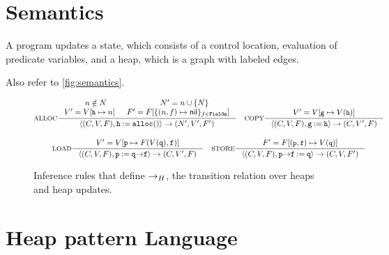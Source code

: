 \section{Semantics}
\label{sec:semantics}
%
A \lang program updates a state, which consists of a control location,
evaluation of predicate variables, and a heap, which is a graph with
labeled edges.
%

Also refer to \autoref{fig:semantics}.

\begin{figure*}
  \centering
  \begin{gather*}
    \inference[ALLOC]
    { n \notin N & N' = \add{n}{N} \\
      V' = \upd{V}{\cc{h}}{n}
      & F' = F[ \{ (n, f) \mapsto \nil \}_{f \in \fields} ]
    }
    { \langle (C, V, F), \code{h \assign \alloc()} \rangle \step
      (N', V', F')
    } \rulebuffer
    \inference[COPY]
    {  V' = \upd{V}{\cc{g}}{V(\cc{h})}
    }
    { \langle (C, V, F), \code{g \assign h} \rangle \step
      (C, V', F)
    } \\[\rowspace]
    \inference[LOAD]
    { V' = \upd{V}{\code{p}}{F(V(\code{q}), \code{f})}
    }
    { \langle (C, V, F), \code{p \assign q \select f} \rangle \step
      (C, V', F)
    } \rulebuffer
    \inference[STORE]
    { F' = \upd{F}{(\cc{p}, \cc{f})}{V(\cc{q})}
    }
    { \langle (C, V, F), \code{p \select f \assign q } \rangle
      \step
      (C, V, F')
    }
  \end{gather*}
  \caption{Inference rules that define $\rightarrow_H$, the transition
    relation over heaps and heap updates.}
  \label{fig:semantics}
\end{figure*}

\section{Heap pattern Language}
\label{sec:patterns}

